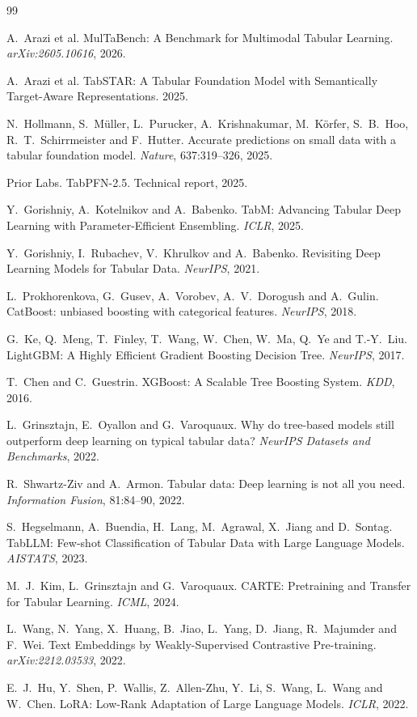 \documentclass[10pt,letterpaper]{article}
\begin{document}
\begin{thebibliography}{99}
\footnotesize

 A.~Arazi et al. MulTaBench: A Benchmark for Multimodal Tabular Learning.
\emph{arXiv:2605.10616}, 2026.

 A.~Arazi et al. TabSTAR: A Tabular Foundation Model with Semantically
Target-Aware Representations. 2025.

 N.~Hollmann, S.~M\"uller, L.~Purucker, A.~Krishnakumar, M.~K\"orfer,
S.~B.~Hoo, R.~T.~Schirrmeister and F.~Hutter. Accurate predictions on small data with a tabular
foundation model. \emph{Nature}, 637:319--326, 2025.

 Prior Labs. TabPFN-2.5. Technical report, 2025.

 Y.~Gorishniy, A.~Kotelnikov and A.~Babenko. TabM: Advancing Tabular Deep
Learning with Parameter-Efficient Ensembling. \emph{ICLR}, 2025.

 Y.~Gorishniy, I.~Rubachev, V.~Khrulkov and A.~Babenko. Revisiting Deep
Learning Models for Tabular Data. \emph{NeurIPS}, 2021.

 L.~Prokhorenkova, G.~Gusev, A.~Vorobev, A.~V.~Dorogush and A.~Gulin.
CatBoost: unbiased boosting with categorical features. \emph{NeurIPS}, 2018.

 G.~Ke, Q.~Meng, T.~Finley, T.~Wang, W.~Chen, W.~Ma, Q.~Ye and T.-Y.~Liu.
LightGBM: A Highly Efficient Gradient Boosting Decision Tree. \emph{NeurIPS}, 2017.

 T.~Chen and C.~Guestrin. XGBoost: A Scalable Tree Boosting System.
\emph{KDD}, 2016.

 L.~Grinsztajn, E.~Oyallon and G.~Varoquaux. Why do tree-based models still
outperform deep learning on typical tabular data? \emph{NeurIPS Datasets and Benchmarks}, 2022.

 R.~Shwartz-Ziv and A.~Armon. Tabular data: Deep learning is not all you
need. \emph{Information Fusion}, 81:84--90, 2022.

 S.~Hegselmann, A.~Buendia, H.~Lang, M.~Agrawal, X.~Jiang and D.~Sontag.
TabLLM: Few-shot Classification of Tabular Data with Large Language Models. \emph{AISTATS},
2023.

 M.~J.~Kim, L.~Grinsztajn and G.~Varoquaux. CARTE: Pretraining and Transfer for
Tabular Learning. \emph{ICML}, 2024.

 L.~Wang, N.~Yang, X.~Huang, B.~Jiao, L.~Yang, D.~Jiang, R.~Majumder and F.~Wei.
Text Embeddings by Weakly-Supervised Contrastive Pre-training. \emph{arXiv:2212.03533}, 2022.

 E.~J.~Hu, Y.~Shen, P.~Wallis, Z.~Allen-Zhu, Y.~Li, S.~Wang, L.~Wang and W.~Chen.
LoRA: Low-Rank Adaptation of Large Language Models. \emph{ICLR}, 2022.

\end{thebibliography}
\end{document}
